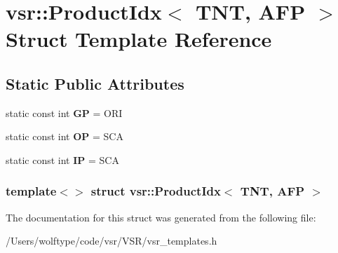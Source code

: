 \hypertarget{structvsr_1_1_product_idx_3_01_t_n_t_00_01_a_f_p_01_4}{\section{vsr\-:\-:Product\-Idx$<$ T\-N\-T, A\-F\-P $>$ Struct Template Reference}
\label{structvsr_1_1_product_idx_3_01_t_n_t_00_01_a_f_p_01_4}
}
\subsection*{Static Public Attributes}
\begin{DoxyCompactItemize}
\item 
\hypertarget{structvsr_1_1_product_idx_3_01_t_n_t_00_01_a_f_p_01_4_a04120caa6bff812b0c109e24f1574889}{static const int {\bfseries G\-P} = O\-R\-I}\label{structvsr_1_1_product_idx_3_01_t_n_t_00_01_a_f_p_01_4_a04120caa6bff812b0c109e24f1574889}

\item 
\hypertarget{structvsr_1_1_product_idx_3_01_t_n_t_00_01_a_f_p_01_4_a26e60604612ce1b7655ff3c83ec5e590}{static const int {\bfseries O\-P} = S\-C\-A}\label{structvsr_1_1_product_idx_3_01_t_n_t_00_01_a_f_p_01_4_a26e60604612ce1b7655ff3c83ec5e590}

\item 
\hypertarget{structvsr_1_1_product_idx_3_01_t_n_t_00_01_a_f_p_01_4_a401bc9fd345fdb94b28f868db5c4774d}{static const int {\bfseries I\-P} = S\-C\-A}\label{structvsr_1_1_product_idx_3_01_t_n_t_00_01_a_f_p_01_4_a401bc9fd345fdb94b28f868db5c4774d}

\end{DoxyCompactItemize}
\subsubsection*{template$<$$>$ struct vsr\-::\-Product\-Idx$<$ T\-N\-T, A\-F\-P $>$}



The documentation for this struct was generated from the following file\-:\begin{DoxyCompactItemize}
\item 
/\-Users/wolftype/code/vsr/\-V\-S\-R/vsr\-\_\-templates.\-h\end{DoxyCompactItemize}
